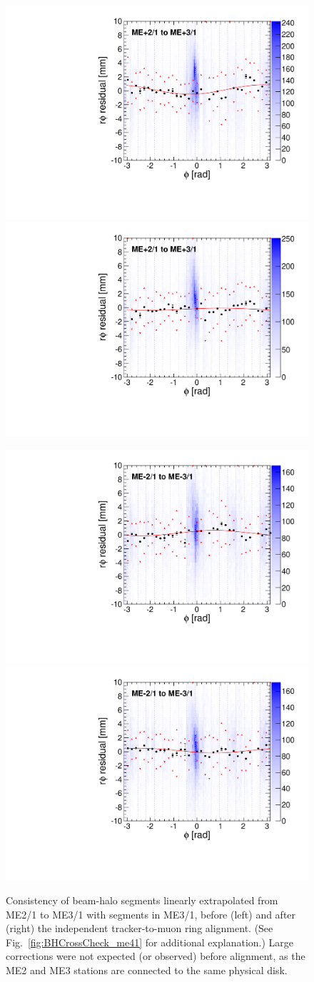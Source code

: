 \documentclass[12pt]{article}
\begin{document}
\begin{figure}
\begin{center}
\includegraphics[width=0.4\linewidth]{BHCrossCheck_mep31_before.pdf}
\includegraphics[width=0.4\linewidth]{BHCrossCheck_mep31_after.pdf}

\includegraphics[width=0.4\linewidth]{BHCrossCheck_mem31_before.pdf}
\includegraphics[width=0.4\linewidth]{BHCrossCheck_mem31_after.pdf}
\end{center}

\caption{Consistency of beam-halo segments linearly extrapolated from
  ME2/1 to ME3/1 with segments in ME3/1, before (left) and after
  (right) the independent tracker-to-muon ring alignment.  (See
  Fig.~\ref{fig:BHCrossCheck_me41} for additional explanation.)  Large
  corrections were not expected (or observed) before alignment, as the
  ME2 and ME3 stations are connected to the same physical
  disk. \label{fig:BHCrossCheck_me31}}
\end{figure}
\end{document}
